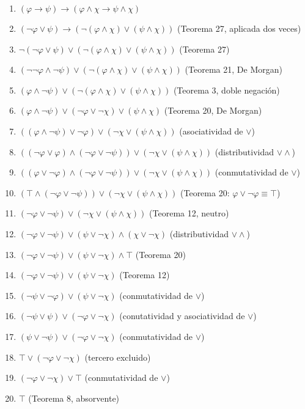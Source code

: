 \documentclass[a4paper,11pt]{article}
\begin{document}
\begin{enumerate}
    \item $(\varphi \rightarrow \psi) \rightarrow (\varphi \land \chi \rightarrow \psi \land \chi)$
    \item $(\neg\varphi \lor \psi) \rightarrow (\neg(\varphi \land \chi) \lor (\psi \land \chi))$ \hfill (Teorema 27, aplicada dos veces)
    \item $\neg(\neg\varphi \lor \psi) \lor (\neg(\varphi \land \chi) \lor (\psi \land \chi))$ \hfill (Teorema 27)
    \item $(\neg\neg\varphi \land \neg\psi) \lor (\neg(\varphi \land \chi) \lor (\psi \land \chi))$ \hfill (Teorema 21, De Morgan)
    \item $(\varphi \land \neg\psi) \lor (\neg(\varphi \land \chi) \lor (\psi \land \chi))$ \hfill (Teorema 3, doble negación)
    \item $(\varphi \land \neg\psi) \lor (\neg\varphi \lor \neg\chi) \lor (\psi \land \chi)$ \hfill (Teorema 20, De Morgan)
    \item $((\varphi \land \neg\psi) \lor \neg\varphi) \lor (\neg\chi \lor (\psi \land \chi))$ \hfill (asociatividad de $\lor$)
    \item $((\neg\varphi \lor \varphi) \land (\neg\varphi \lor \neg\psi)) \lor (\neg\chi \lor (\psi \land \chi))$ \hfill (distributividad $\lor\land$)
    \item $((\varphi \lor \neg\varphi) \land (\neg\varphi \lor \neg\psi)) \lor (\neg\chi \lor (\psi \land \chi))$ \hfill (conmutatividad de $\lor$)
    \item $(\top \land (\neg\varphi \lor \neg\psi)) \lor (\neg\chi \lor (\psi \land \chi))$ \hfill (Teorema 20: $\varphi \lor \neg\varphi \equiv \top$)
    \item $(\neg\varphi \lor \neg\psi) \lor (\neg\chi \lor (\psi \land \chi))$ \hfill (Teorema 12, neutro)
    \item $(\neg\varphi \lor \neg\psi) \lor (\psi \lor \neg\chi) \land (\chi \lor \neg\chi)$ \hfill (distributividad $\lor\land$)
    \item $(\neg\varphi \lor \neg\psi) \lor (\psi \lor \neg\chi) \land \top$ \hfill (Teorema 20)
    \item $(\neg\varphi \lor \neg\psi) \lor (\psi \lor \neg\chi)$ \hfill (Teorema 12)
    \item $(\neg\psi \lor \neg\varphi) \lor (\psi \lor \neg\chi)$ \hfill (conmutatividad de $\lor$)
    \item $(\neg\psi \lor \psi) \lor (\neg\varphi \lor \neg\chi)$ \hfill (conutatividad y asociatividad de $\lor$)
    \item $(\psi \lor \neg\psi) \lor (\neg\varphi \lor \neg\chi)$ \hfill (conmutatividad de $\lor$)
    \item $\top \lor (\neg\varphi \lor \neg\chi)$ \hfill (tercero excluido)
    \item $(\neg\varphi \lor \neg\chi) \lor \top$ \hfill (conmutatividad de $\lor$)
    \item $\top$ \hfill (Teorema 8, absorvente)
\end{enumerate}
\end{document}
